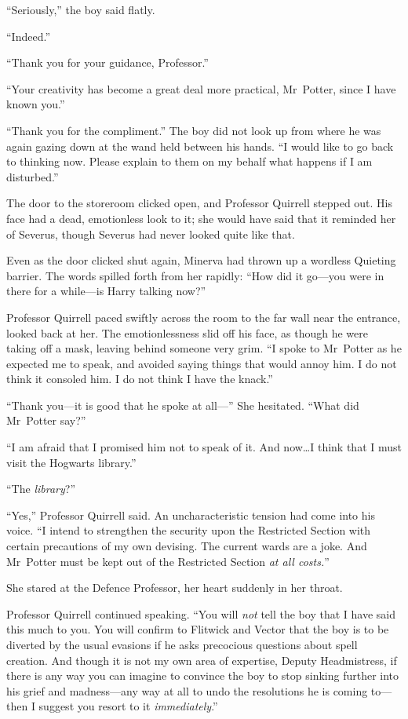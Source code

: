 “Seriously,” the boy said flatly.

“Indeed.”

“Thank you for your guidance, Professor.”

“Your creativity has become a great deal more practical, Mr~Potter, since I have known you.”

“Thank you for the compliment.” The boy did not look up from where he was again gazing down at the wand held between his hands.
“I would like to go back to thinking now. Please explain to them on my behalf what happens if I am disturbed.”

\later

The door to the storeroom clicked open, and Professor Quirrell stepped out. His face had a dead, emotionless look to it; she would have said that it reminded her of Severus, though Severus had never looked quite like that.

Even as the door clicked shut again, Minerva had thrown up a wordless Quieting barrier. The words spilled forth from her rapidly:
“How did it go—you were in there for a while—is Harry talking now?”

Professor Quirrell paced swiftly across the room to the far wall near the entrance, looked back at her. The emotionlessness slid off his face, as though he were taking off a mask, leaving behind someone very grim.
“I spoke to Mr~Potter as he expected me to speak, and avoided saying things that would annoy him. I do not think it consoled him. I do not think I have the knack.”

“Thank you—it is good that he spoke at all—” She hesitated.
“What did Mr~Potter say?”

“I am afraid that I promised him not to speak of it. And now…I think that I must visit the Hogwarts library.”

“The \emph{library}?”

“Yes,” Professor Quirrell said. An uncharacteristic tension had come into his voice.
“I intend to strengthen the security upon the Restricted Section with certain precautions of my own devising. The current wards are a joke. And Mr~Potter must be kept out of the Restricted Section \emph{at all costs.}”

She stared at the Defence Professor, her heart suddenly in her throat.

Professor Quirrell continued speaking.
“You will \emph{not} tell the boy that I have said this much to you. You will confirm to Flitwick and Vector that the boy is to be diverted by the usual evasions if he asks precocious questions about spell creation. And though it is not my own area of expertise, Deputy Headmistress, if there is any way you can imagine to convince the boy to stop sinking further into his grief and madness—any way at all to undo the resolutions he is coming to—then I suggest you resort to it \emph{immediately}.”
